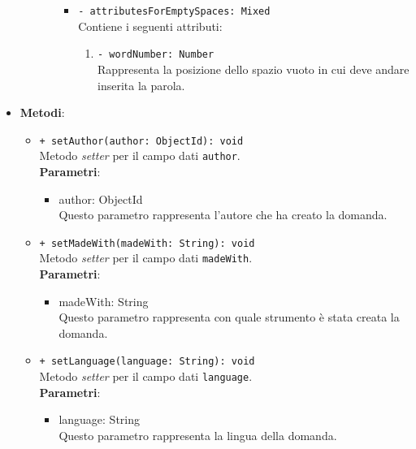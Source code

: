 \begin{itemize}
\begin{itemize}
\begin{itemize}
\begin{itemize}
\begin{enumerate}
						\end{enumerate}    
						\item \texttt{- attributesForEmptySpaces: Mixed}\\
						Contiene i seguenti attributi:
						\begin{enumerate}
							\item \texttt{- wordNumber: Number}\\
							Rappresenta la posizione dello spazio vuoto in cui deve andare inserita la parola.  
						\end{enumerate}        						  						
					\end{itemize}
				\end{itemize}			
			\end{itemize}
			\item \textbf{Metodi}: 
			\begin{itemize}
				\item \texttt{+ setAuthor(author: ObjectId): void} \\
				Metodo \textit{setter} per il campo dati \texttt{author}.\\
				\textbf{Parametri}:
				\begin{itemize}
					\item {author: ObjectId}\\
					Questo parametro rappresenta l'autore che ha creato la domanda.
				\end{itemize}
				
				\item \texttt{+ setMadeWith(madeWith: String): void} \\
				Metodo \textit{setter} per il campo dati \texttt{madeWith}.\\
				\textbf{Parametri}:
				\begin{itemize}
					\item {madeWith: String}\\
					Questo parametro rappresenta con quale strumento è stata creata la domanda.
				\end{itemize}
				
				\item \texttt{+ setLanguage(language: String): void} \\
				Metodo \textit{setter} per il campo dati \texttt{language}.\\
				\textbf{Parametri}:
				\begin{itemize}
					\item {language: String}\\
					Questo parametro rappresenta la lingua della domanda.
				\end{itemize}
				

\end{itemize}
\end{itemize}
